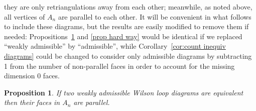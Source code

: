 \documentclass[11pt]{article}
\newtheorem{prop}[thm]{Proposition}
\theoremstyle{remark}
\theoremstyle{definition}
\begin{document}
 they are only retriangulations away from each other; meanwhile, as noted above, all vertices of $A_n$ are parallel to each other.  It will be convenient in what follows to include these diagrams, but the results are easily modified to remove them if needed: Propositions~\ref{prop easy way} and \ref{prop hard way} would be identical if we replaced ``weakly admissible'' by ``admissible'', while Corollary~\ref{cor:count inequiv diagrams} could be changed to consider only admissible diagrams by subtracting 1 from the number of non-parallel faces in order to account for the missing dimension 0 faces.

\begin{prop}\label{prop easy way}
  If two weakly admissible Wilson loop diagrams are equivalent then their faces in $A_n$ are parallel.
\end{prop}
\end{document}
